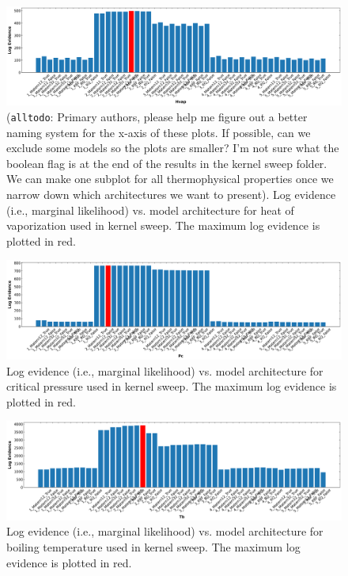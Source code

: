 \documentclass[journal=jacsat,manuscript=article]{achemso}
\newcommand{\alltodo}[1]{{\color{Cyan} (\texttt{alltodo}: #1)}}
\begin{document}
\begin{figure}
    \centering
    \includegraphics[width=\linewidth]{images/lml_bar_chart_Hvap.png}
    \caption{\alltodo{Primary authors, please help me figure out a better naming system for the x-axis of these plots. If possible, can we exclude some models so the plots are smaller? I'm not sure what the boolean flag is at the end of the results in the kernel sweep folder. We can make one subplot for all thermophysical properties once we narrow down which architectures we want to present}. Log evidence (i.e., marginal likelihood) vs. model architecture for heat of vaporization used in kernel sweep. The maximum log evidence is plotted in red.}
\end{figure}
\begin{figure}
    \centering
    \includegraphics[width=\linewidth]{images/lml_bar_chart_Pc.png}
    \caption{Log evidence (i.e., marginal likelihood) vs. model architecture for critical pressure used in kernel sweep. The maximum log evidence is plotted in red.}
\end{figure}
\begin{figure}
    \centering
    \includegraphics[width=\linewidth]{images/lml_bar_chart_Tb.png}
    \caption{Log evidence (i.e., marginal likelihood) vs. model architecture for boiling temperature used in kernel sweep. The maximum log evidence is plotted in red.}
\end{figure}
\end{document}
